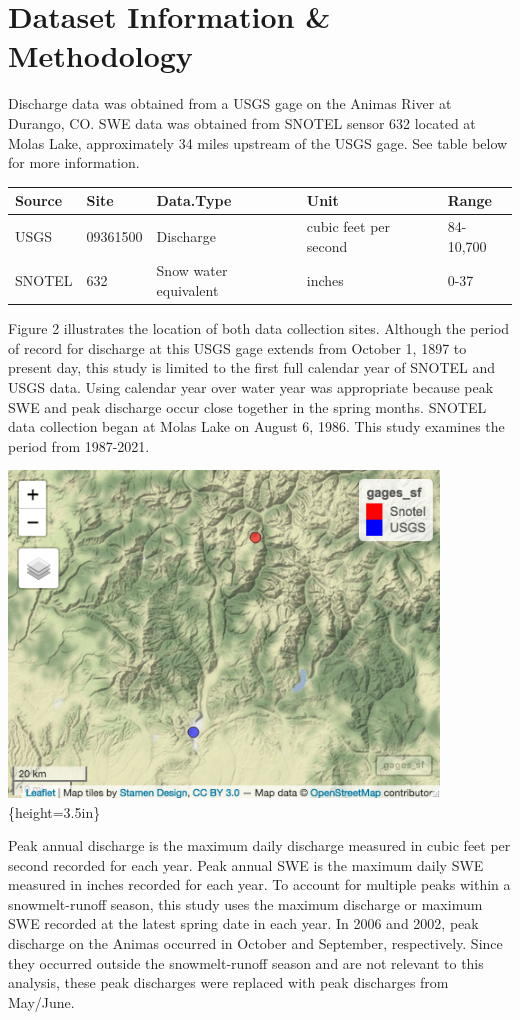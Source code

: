 \documentclass[
  12pt,
]{article}
\begin{document}
\newpage

\hypertarget{dataset-information-methodology}{%
\section{Dataset Information \&
Methodology}\label{dataset-information-methodology}}

Discharge data was obtained from a USGS gage on the Animas River at
Durango, CO. SWE data was obtained from SNOTEL sensor 632 located at
Molas Lake, approximately 34 miles upstream of the USGS gage. See table
below for more information.

\begin{longtable}[]{@{}lllll@{}}
\toprule
Source & Site & Data.Type & Unit & Range\tabularnewline
\midrule
\endhead
USGS & 09361500 & Discharge & cubic feet per second &
84-10,700\tabularnewline
SNOTEL & 632 & Snow water equivalent & inches & 0-37\tabularnewline
\bottomrule
\end{longtable}

Figure 2 illustrates the location of both data collection sites.
Although the period of record for discharge at this USGS gage extends
from October 1, 1897 to present day, this study is limited to the first
full calendar year of SNOTEL and USGS data. Using calendar year over
water year was appropriate because peak SWE and peak discharge occur
close together in the spring months. SNOTEL data collection began at
Molas Lake on August 6, 1986. This study examines the period from
1987-2021.

\includegraphics[width=4.5in,height=\textheight]{gage_locations.png}\{height=3.5in\}

Peak annual discharge is the maximum daily discharge measured in cubic
feet per second recorded for each year. Peak annual SWE is the maximum
daily SWE measured in inches recorded for each year. To account for
multiple peaks within a snowmelt-runoff season, this study uses the
maximum discharge or maximum SWE recorded at the latest spring date in
each year. In 2006 and 2002, peak discharge on the Animas occurred in
October and September, respectively. Since they occurred outside the
snowmelt-runoff season and are not relevant to this analysis, these peak
discharges were replaced with peak discharges from May/June.
\end{document}
